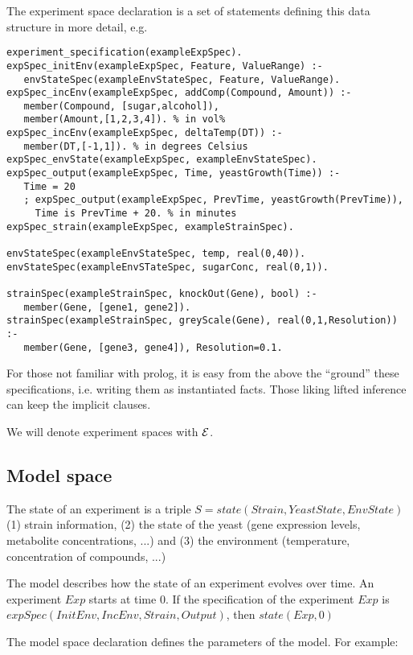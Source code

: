 \documentclass{article}
\begin{document}
The experiment space declaration is a set of statements defining this data structure in more detail, e.g.

\begin{verbatim}
experiment_specification(exampleExpSpec).
expSpec_initEnv(exampleExpSpec, Feature, ValueRange) :-
   envStateSpec(exampleEnvStateSpec, Feature, ValueRange).
expSpec_incEnv(exampleExpSpec, addComp(Compound, Amount)) :- 
   member(Compound, [sugar,alcohol]), 
   member(Amount,[1,2,3,4]). % in vol%
expSpec_incEnv(exampleExpSpec, deltaTemp(DT)) :-
   member(DT,[-1,1]). % in degrees Celsius
expSpec_envState(exampleExpSpec, exampleEnvStateSpec).
expSpec_output(exampleExpSpec, Time, yeastGrowth(Time)) :- 
   Time = 20 
   ; expSpec_output(exampleExpSpec, PrevTime, yeastGrowth(PrevTime)),
     Time is PrevTime + 20. % in minutes
expSpec_strain(exampleExpSpec, exampleStrainSpec).

envStateSpec(exampleEnvStateSpec, temp, real(0,40)).
envStateSpec(exampleEnvSTateSpec, sugarConc, real(0,1)).

strainSpec(exampleStrainSpec, knockOut(Gene), bool) :-
   member(Gene, [gene1, gene2]).
strainSpec(exampleStrainSpec, greyScale(Gene), real(0,1,Resolution)) :-
   member(Gene, [gene3, gene4]), Resolution=0.1.
\end{verbatim}

{\small{For those not familiar with prolog, it is easy from the above the ``ground'' these specifications, i.e. writing them as instantiated facts.  Those liking lifted inference can keep the implicit clauses.}}

We will denote experiment spaces with $\mathcal{E}$.

\subsection{Model space}

The state of an experiment is a triple $S=state(Strain, YeastState, EnvState)$ (1) strain information, (2) the state of the yeast (gene expression levels, metabolite concentrations, ...) and (3) the environment (temperature, concentration of compounds, ...)

The model describes how the state of an experiment evolves over time.
An experiment $Exp$ starts at time $0$.
If the specification of the experiment $Exp$ is $expSpec(InitEnv,IncEnv,Strain,Output)$, then $state(Exp,0)$

The model space declaration defines the parameters of the model.  For example:
\end{document}
